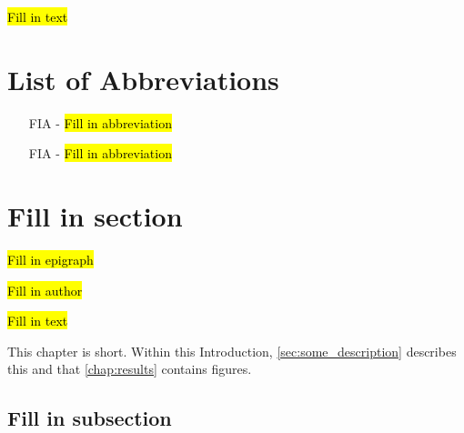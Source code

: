 \documentclass[oneside]{book}
\begin{document}
\hl{Fill in text}

\chaptercloser

\pagestyle{plain}
\renewcommand{\contentsname}{Table of Contents}
\tableofcontents
\clearpage

\listoffigures
{}
\clearpage

\listoftables
{}
\clearpage


\chapter{List of Abbreviations}
\begin{itemize}
\item[FIA - ] \hl{Fill in abbreviation}
\item[FIA - ] \hl{Fill in abbreviation}
\end{itemize}


\mainmatter %
\chapter{Fill in section}

\pagestyle{fancy}

\label{chap:introduction}
\epigraph{\hl{Fill in epigraph}}{\hl{Fill in author}}

\hl{Fill in text}\cite{citation1, citation2}

This chapter is short.
Within this Introduction,
\autoref{sec:some_description} describes this and that
\autoref{chap:results} contains figures.

\section{Fill in subsection}
\label{sec:some_description}
\end{document}
